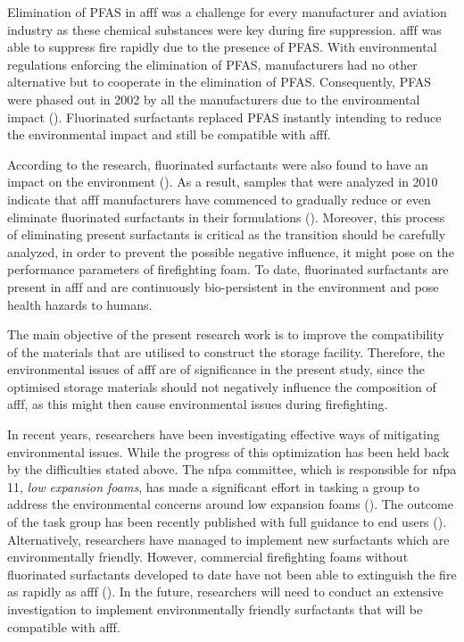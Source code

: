 Elimination of PFAS in \acrshort{afff} was a challenge for every manufacturer and aviation industry as these chemical substances were key during fire suppression. \acrshort{afff} was able to suppress fire rapidly due to the presence of PFAS. With environmental regulations enforcing the elimination of PFAS, manufacturers had no other alternative but to cooperate in the elimination of PFAS. Consequently, PFAS were phased out in 2002 by all the manufacturers due to the environmental impact (\cite{persson2003foamspex}).  Fluorinated surfactants replaced PFAS instantly intending to reduce the environmental impact and still be compatible with \acrshort{afff}.  

According to the research, fluorinated surfactants were also found to have an impact on the environment (\cite{martin2012fire}). As a result, samples that were analyzed in 2010 indicate that \acrshort{afff} manufacturers have commenced to gradually reduce or even eliminate fluorinated surfactants in their formulations (\cite{milley2018estimating}). Moreover, this process of eliminating present surfactants is critical as the transition should be carefully analyzed, in order to prevent the possible negative influence, it might pose on the performance parameters of firefighting foam. To date, fluorinated surfactants are present in \acrshort{afff} and are continuously bio-persistent in the environment and pose health hazards to humans. 

The main objective of the present research work is to improve the compatibility of the materials that are utilised to construct the storage facility. Therefore, the environmental issues of \acrshort{afff} are of significance in the present study, since the optimised storage materials should not negatively influence the composition of \acrshort{afff}, as this might then cause environmental issues during firefighting.  

In recent years, researchers have been investigating effective ways of mitigating environmental issues. While the progress of this optimization has been held back by the difficulties stated above. The \acrshort{nfpa} committee, which is responsible for \acrshort{nfpa} 11, \emph{low expansion foams}, has made a significant effort in tasking a group to address the environmental concerns around low expansion foams (\cite{scheffey1995evaluating}). The outcome of the task group has been recently published with full guidance to end users (\cite{scheffey1995evaluating}). Alternatively, researchers have managed to implement new surfactants which are environmentally friendly. However, commercial firefighting foams without fluorinated surfactants developed to date have not been able to extinguish the fire as rapidly as \acrshort{afff} (\cite{hinnant2017influence}). In the future, researchers will need to conduct an extensive investigation to implement environmentally friendly surfactants that will be compatible with \acrshort{afff}.

